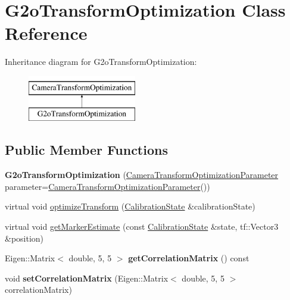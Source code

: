 \hypertarget{classG2oTransformOptimization}{\section{\-G2o\-Transform\-Optimization \-Class \-Reference}
\label{classG2oTransformOptimization}
}
\-Inheritance diagram for \-G2o\-Transform\-Optimization\-:\begin{figure}[H]
\begin{center}
\leavevmode
\includegraphics[height=2.000000cm]{classG2oTransformOptimization}
\end{center}
\end{figure}
\subsection*{\-Public \-Member \-Functions}
\begin{DoxyCompactItemize}
\item 
\hypertarget{classG2oTransformOptimization_a41c3b47772cfaa74e0d6a6dbaa853d11}{{\bfseries \-G2o\-Transform\-Optimization} (\hyperlink{classCameraTransformOptimizationParameter}{\-Camera\-Transform\-Optimization\-Parameter} parameter=\hyperlink{classCameraTransformOptimizationParameter}{\-Camera\-Transform\-Optimization\-Parameter}())}\label{classG2oTransformOptimization_a41c3b47772cfaa74e0d6a6dbaa853d11}

\item 
virtual void \hyperlink{classG2oTransformOptimization_a8a644d4ab3d5cacd4cc56f716dfd648d}{optimize\-Transform} (\hyperlink{classCalibrationState}{\-Calibration\-State} \&calibration\-State)
\item 
virtual void \hyperlink{classG2oTransformOptimization_a2b3606f70377e7736712c131fe48d1ae}{get\-Marker\-Estimate} (const \hyperlink{classCalibrationState}{\-Calibration\-State} \&state, tf\-::\-Vector3 \&position)
\item 
\hypertarget{classG2oTransformOptimization_a4d661d25a7b57ebf389d5fb9e22d7e27}{\-Eigen\-::\-Matrix$<$ double, 5, 5 $>$ {\bfseries get\-Correlation\-Matrix} () const }\label{classG2oTransformOptimization_a4d661d25a7b57ebf389d5fb9e22d7e27}

\item 
\hypertarget{classG2oTransformOptimization_a2e926b516a5b1b3a81b395f986c86bbc}{void {\bfseries set\-Correlation\-Matrix} (\-Eigen\-::\-Matrix$<$ double, 5, 5 $>$ correlation\-Matrix)}\label{classG2oTransformOptimization_a2e926b516a5b1b3a81b395f986c86bbc}

\end{DoxyCompactItemize}


